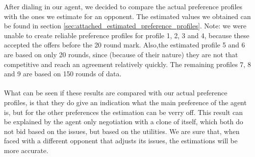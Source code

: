 After dialing in our agent, we decided to compare the actual preference profiles with the ones we estimate for an opponent.
The estimated values we obtained can be found in section \ref{sec:attached_estimated_preference_profiles}. Note: we were unable to create reliable preference profiles for profile 1, 2, 3 and 4, because these accepted the offers before the 20 round mark. Also,the estimated profile 5 and 6 are based on only 20 rounds, since (because of their nature) they are not that competitive and reach an agreement relatively quickly. The remaining profiles 7, 8 and 9 are based on 150 rounds of data.
\\\\
What can be seen if these results are compared with our actual preference profiles, is that they do give an indication what the main preference of the agent is, but for the other preferences the estimation can be verry off. This result can be explained by the agent only negotiation with a clone of itself, which both do not bid based on the issues, but based on the utilities. We are sure that, when faced with a different opponent that adjusts its issues, the estimations will be more accurate.